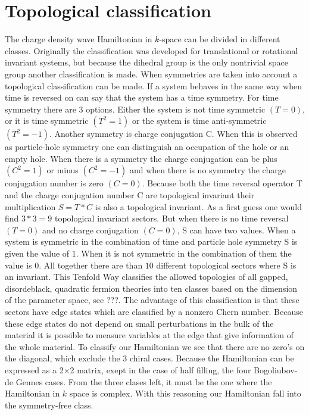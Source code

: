 \documentclass[letterpaper, 10 pt, conference]{ieeeconf}  %
\begin{document}
\section{Topological classification}
The charge density wave Hamiltonian in $k$-space can be divided in different
classes. Originally the classification was developed for translational or
rotational invariant systems, but because the dihedral group is the only
nontrivial space group another classification is made. When symmetries are taken
into account a topological classification can be made. If a system behaves in
the same way when time is reversed on can say that the system has a time
symmetry. For time symmetry there are 3 options. Either the system is not time
symmetric $(T=0)$, or it is time symmetric $(T^2=1)$ or the system is time
anti-symmetric  $(T^2=-1)$.  Another symmetry  is charge conjugation C. When
this is observed as particle-hole symmetry one can distinguish an occupation of
the hole or an empty hole. When there is a symmetry the  charge conjugation can
be plus $(C^2=1)$ or minus $(C^2=-1)$ and when there is no symmetry  the charge
conjugation number  is zero $(C=0)$.  Because both the time reversal operator T
and the charge conjugation number C are topological invariant their
multiplication $S=T * C $ is also a topological invariant. As a first guess one
would find $3 * 3 = 9 $ topological invariant sectors. But when there is no time
reversal $(T=0)$ and no charge conjugation $(C=0)$, S can have two values. When
a system is symmetric in the combination of time and particle hole symmetry S is
given the value of $1$. When it is not symmetric in the combination of them the
value is $0$. All together there are than $10$ different topological sectors
where S is an invariant. This Tenfold Way classifies the allowed topologies of
all gapped, disordeblack, quadratic fermion theories into ten classes based on the
dimension of the parameter space, see ???. The advantage of this classification is that
these sectors have edge states which are classified by a nonzero Chern number.
Because these edge states do not
depend on small perturbations in the bulk of the material it is possible to
measure variables at the edge that give information of the whole material.
To classify our Hamiltonian we see that there are no zero's on the diagonal,
which exclude the 3 chiral cases. Because the Hamiltonian can be expressed as a 2$\times$2
 matrix, exept in the case of half filling, the four Bogoliubov-de Gennes cases. From the three
 clases left, it must be the one where the Hamiltonian in $k$ space is complex.
 With this reasoning our Hamiltonian fall into the symmetry-free class.
\end{document}
